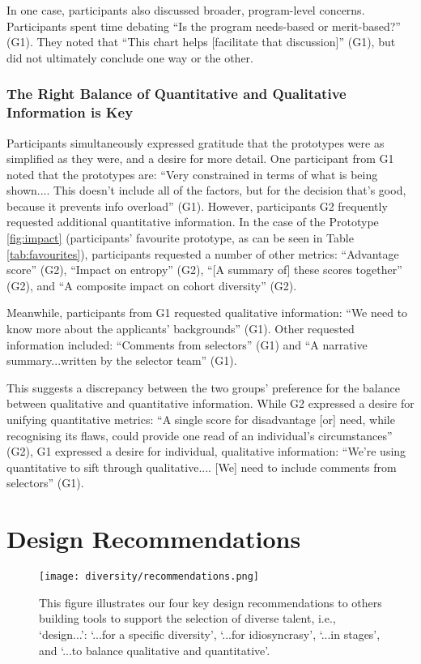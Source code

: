 In one case, participants also discussed broader, program-level concerns. Participants spent time debating ``Is the program needs-based or merit-based?'' (G1). They noted  that ``This chart helps [facilitate that discussion]'' (G1), but did not ultimately conclude one way or the other.

\subsubsection{The Right Balance of Quantitative and Qualitative Information is Key}
Participants simultaneously expressed gratitude that the prototypes were as simplified as they were, and a desire for more detail. One participant from G1 noted that the prototypes are: ``Very constrained in terms of what is being shown.... This doesn't include all of the factors, but for the decision that's good, because it prevents info overload'' (G1). However, participants G2 frequently requested additional quantitative information. In the case of the Prototype \ref{fig:impact} (participants' favourite prototype, as can be seen in Table \ref{tab:favourites}), participants requested a number of other metrics: ``Advantage score'' (G2), ``Impact on entropy'' (G2), ``[A summary of] these scores together'' (G2), and ``A composite impact on cohort diversity'' (G2).

Meanwhile, participants from G1 requested qualitative information: ``We need to know more about the applicants' backgrounds'' (G1). Other requested information included: ``Comments from selectors'' (G1) and ``A narrative summary...written by the selector team'' (G1). 

This suggests a discrepancy between the two groups' preference for the balance between qualitative and quantitative information. While G2 expressed a desire for unifying quantitative metrics: ``A single score for disadvantage [or] need, while recognising its flaws, could provide one read of an individual's circumstances'' (G2), G1 expressed a desire for individual, qualitative information: ``We're using quantitative to sift through qualitative.... [We] need to include comments from selectors'' (G1).


\section{Design Recommendations}
\begin{figure}[htbp]
    \centering
    \texttt{[image: diversity/recommendations.png]}
    \caption{This figure illustrates our four key design recommendations to others building tools to support the selection of diverse talent, i.e., `design...': `...for a specific diversity', `...for idiosyncrasy', `...in stages', and `...to balance qualitative and quantitative'.}
    \label{fig:recommendations}
\end{figure}

